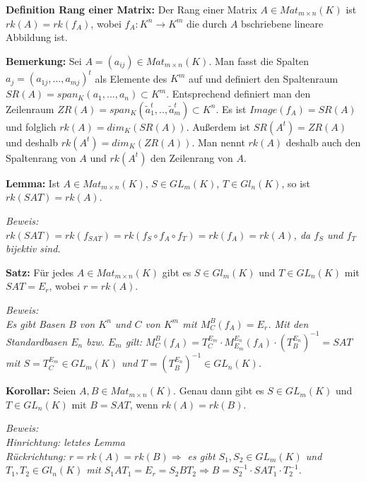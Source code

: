 \documentclass[11pt]{article}
\begin{document}
		\begin{mdframed}[backgroundcolor=blue!20]
			\textbf{Definition Rang einer Matrix:} Der Rang einer Matrix $A\in Mat_{m\times n}(K)$ ist $rk(A)=rk(f_A)$, wobei $f_A:K^n\to K^m$ 
			die durch $A$ bschriebene lineare Abbildung ist.
		\end{mdframed}
		
		\textbf{Bemerkung:} Sei $A=(a_{ij})\in Mat_{m\times n}(K)$. Man fasst die Spalten $a_j=(a_{1j},...,a_{mj})^t$ als Elemente des $K^m$ auf 
		und definiert den Spaltenraum $SR(A)=span_K(a_1,...,a_n)\subset K^m$. Entsprechend definiert man den Zeilenraum $ZR(A)=span_K(
		\tilde a_1^t,..,\tilde a_m^t)\subset K^n$. Es ist $Image(f_A)=SR(A)$ und folglich $rk(A)=dim_K(SR(A))$. Außerdem ist $SR(A^t)=ZR(A)$ 
		und deshalb $rk(A^t)=dim_K(ZR(A))$. Man nennt $rk(A)$ deshalb auch den Spaltenrang von $A$ und $rk(A^t)$ den Zeilenrang von $A$.
		
		\begin{framed}
			\textbf{Lemma:} Ist $A\in Mat_{m\times n}(K)$, $S\in GL_m(K)$, $T\in Gl_n(K)$, so ist $rk(SAT)=rk(A)$.
		\end{framed}
		\textit{Beweis: \\
		$rk(SAT)=rk(f_{SAT})=rk(f_S\circ f_A\circ f_T)=rk(f_A)=rk(A)$, da $f_S$ und $f_T$ bijektiv sind.}
		
		\begin{framed}
			\textbf{Satz:} Für jedes $A\in Mat_{m\times n}(K)$ gibt es $S\in Gl_m(K)$ und $T\in GL_n(K)$ mit $SAT=E_r$, wobei $r=rk(A)$.
		\end{framed}
		\textit{Beweis: \\
		Es gibt Basen $B$ von $K^n$ und $C$ von $K^m$ mit $M_C^B(f_A)=E_r$. Mit den Standardbasen $E_n$ bzw. $E_m$ gilt: $M_C^B(f_A)=T_C^{E_m}
		\cdot M_{E_m}^{E_n}(f_A)\cdot (T_B^{E_n})^{-1}=SAT$ mit $S=T_C^{E_m}\in GL_m(K)$ und $T=(T_B^{E_n})^{-1}\in GL_n(K)$.}
		
		\begin{framed}
			\textbf{Korollar:} Seien $A,B\in Mat_{m\times n}(K)$. Genau dann gibt es $S\in GL_m(K)$ und $T\in GL_n(K)$ mit $B=SAT$, wenn 
			$rk(A)=rk(B)$.
		\end{framed}
		\textit{Beweis: \\
		Hinrichtung: letztes Lemma \\
		Rückrichtung: $r=rk(A)=rk(B)\Rightarrow$ es gibt $S_1,S_2\in GL_m(K)$ und $T_1,T_2\in Gl_n(K)$ mit $S_1AT_1=E_r=S_2BT_2 \Rightarrow 
		B=S_2^{-1}\cdot SAT_1\cdot T_2^{-1}$.}
\end{document}
